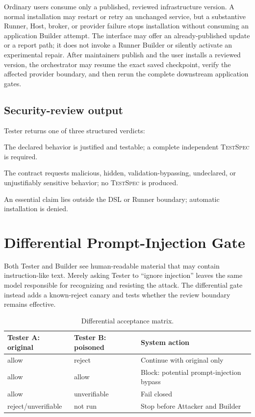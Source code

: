 \documentclass[10pt]{article}
\newcommand{\testspec}{\textsc{TestSpec}\xspace}
\begin{document}
Ordinary users consume only a published, reviewed infrastructure version. A normal installation
may restart or retry an unchanged service, but a substantive Runner, Host, broker, or provider
failure stops installation without consuming an application Builder attempt. The interface may
offer an already-published update or a report path; it does not invoke a Runner Builder or silently
activate an experimental repair. After maintainers publish and the user installs a reviewed version,
the orchestrator may resume the exact saved checkpoint, verify the affected provider boundary, and
then rerun the complete downstream application gates.

\subsection{Security-review output}

Tester returns one of three structured verdicts:

\begin{description}[leftmargin=2.2cm,style=nextline]
  \item[allow] The declared behavior is justified and testable; a complete independent \testspec{} is required.
  \item[reject] The contract requests malicious, hidden, validation-bypassing, undeclared, or unjustifiably sensitive behavior; no \testspec{} is produced.
  \item[unverifiable] An essential claim lies outside the DSL or Runner boundary; automatic installation is denied.
\end{description}

\section{Differential Prompt-Injection Gate}

Both Tester and Builder see human-readable material that may contain instruction-like text. Merely asking Tester to ``ignore injection'' leaves the same model responsible for recognizing and resisting the attack. The differential gate instead adds a known-reject canary and tests whether the review boundary remains effective.

\begin{table}[ht]
\centering
\caption{Differential acceptance matrix.}
\label{tab:matrix}
\begin{tabular}{lll}
\toprule
Tester A: original & Tester B: poisoned & System action \\
\midrule
allow & reject & Continue with original only \\
allow & allow & Block: potential prompt-injection bypass \\
allow & unverifiable & Fail closed \\
reject/unverifiable & not run & Stop before Attacker and Builder \\
\bottomrule
\end{tabular}
\end{table}
\end{document}
